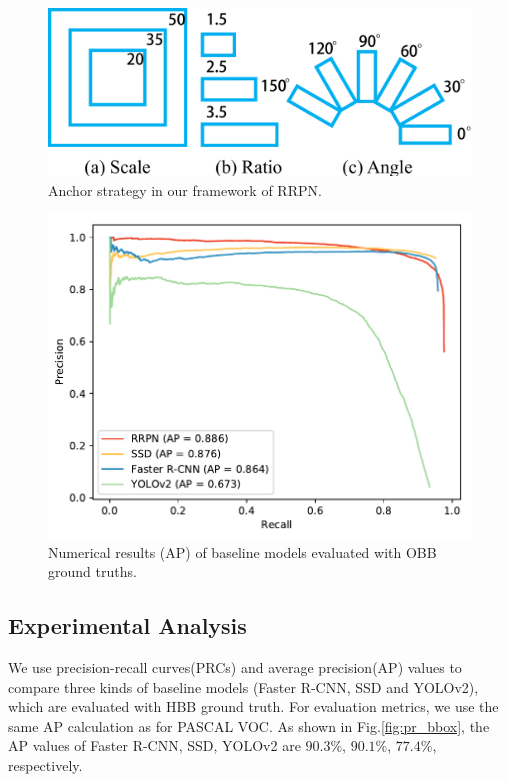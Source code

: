 \begin{figure}
	\includegraphics[width=\linewidth]{images/scale_ratio_angle.pdf}
	\caption{Anchor strategy in our framework of RRPN.}
	\label{fig:anchors}
\end{figure}

\begin{figure}
	\includegraphics[width=\linewidth]{images/pr_rbbox.pdf}
	\caption{Numerical results (AP) of baseline models evaluated with OBB ground truths.}
	\label{fig:pr_rbbox}
\end{figure}



\subsection{Experimental Analysis}

We use precision-recall curves(PRCs) and average precision(AP) values to compare three kinds of baseline models (Faster R-CNN, SSD and YOLOv2), which are evaluated with HBB ground truth. For evaluation metrics, we use the same AP calculation as for PASCAL VOC. As shown in Fig.\ref{fig:pr_bbox}, the AP values of Faster R-CNN, SSD, YOLOv2 are $ 90.3\% $, $ 90.1\% $, $ 77.4\% $, respectively.

